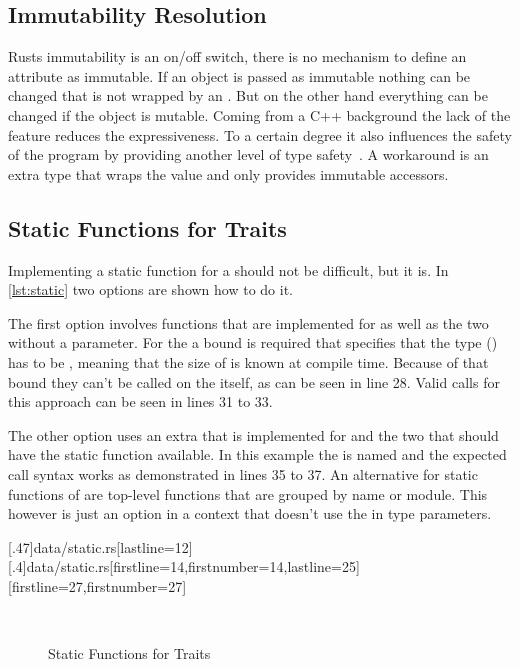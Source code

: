 \documentclass[thesis]{subfiles}
\begin{document}

  \subsection{Immutability Resolution}
    Rusts immutability is an on/off switch, there is no mechanism to define an attribute as immutable.
    If an object is passed as immutable nothing can be changed that is not wrapped by an \UnsafeCellT.
    But on the other hand everything can be changed if the object is mutable.
    Coming from a C++ background the lack of the  feature reduces the expressiveness.
    To a certain degree it also influences the safety of the program by providing another level of type safety~\autocite[30ff.]{cpp101}.
    A workaround is an extra type that wraps the value and only provides immutable accessors.

  \subsection{Static Functions for Traits}
    Implementing a static function for a \trait should not be difficult, but it is.
    In \autoref{lst:static} two options are shown how to do it.

    The first option involves functions that are implemented for \Foo as well as the two \traits without a \self parameter.
    For the \traits a bound is required that specifies that the \self type (\Self) has to be \Sized, meaning that the size of \Self is known at compile time.
    Because of that bound they can't be called on the \trait itself, as can be seen in line 28.
    Valid calls for this approach can be seen in lines 31 to 33.

    The other option uses an extra \trait that is implemented for \Foo and the two \traits that should have the static function available.
    In this example the \trait is named  and the expected call syntax works as demonstrated in lines 35 to 37.
    An alternative for static functions of \traits are top-level functions that are grouped by name or module.
    This however is just an option in a context that doesn't use the \trait in type parameters.

    \LstTikzBox{\staticOne}[.47\linewidth]{data/static.rs}[lastline=12]
    \LstTikzBox{\staticTwo}[.4\linewidth]{data/static.rs}[firstline=14,firstnumber=14,lastline=25]
    [firstline=27,firstnumber=27]
    \begin{figure}[ht]
      \captionsetup{type=lstlisting}
      \centering
      \usebox{\staticOne}\hfill%
      \usebox{\staticTwo}\\\vspace*{.75em}%
      \usebox{\staticThree}
      \caption{Static Functions for Traits}\label{lst:static}
    \end{figure}
\end{document}
